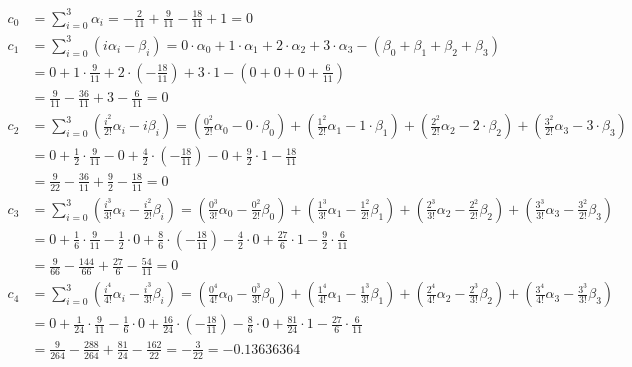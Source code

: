 \begin{align}
    c_0 &= \sum_{i=0}^{3} \alpha_i = -\frac{2}{11} + \frac{9}{11} - \frac{18}{11} + 1 = 0 \\
    c_1 &= \sum_{i=0}^{3} (i\alpha_i - \beta_i) = 0 \cdot \alpha_0 + 1 \cdot \alpha_1 + 2 \cdot \alpha_2 + 3 \cdot \alpha_3 - (\beta_0 + \beta_1 + \beta_2 + \beta_3) \nonumber \\
    &= 0 + 1 \cdot \frac{9}{11} + 2 \cdot \left(-\frac{18}{11}\right) + 3 \cdot 1 - \left(0 + 0 + 0 + \frac{6}{11}\right) \nonumber \\
    &= \frac{9}{11} - \frac{36}{11} + 3 - \frac{6}{11} = 0 \\
    c_2 &= \sum_{i=0}^{3} \left(\frac{i^2}{2!} \alpha_i - i \beta_i \right) = \left(\frac{0^2}{2!} \alpha_0 - 0 \cdot \beta_0\right) + \left(\frac{1^2}{2!} \alpha_1 - 1 \cdot \beta_1\right) + \left(\frac{2^2}{2!} \alpha_2 - 2 \cdot \beta_2\right) + \left(\frac{3^2}{2!} \alpha_3 - 3 \cdot \beta_3\right) \nonumber \\
    &= 0 + \frac{1}{2} \cdot \frac{9}{11} - 0 + \frac{4}{2} \cdot \left(-\frac{18}{11}\right) - 0 + \frac{9}{2} \cdot 1 - \frac{18}{11} \nonumber \\
    &= \frac{9}{22} - \frac{36}{11} + \frac{9}{2} - \frac{18}{11} = 0 \\
    c_3 &= \sum_{i=0}^{3} \left(\frac{i^3}{3!} \alpha_i - \frac{i^2}{2!} \beta_i \right) = \left(\frac{0^3}{3!} \alpha_0 - \frac{0^2}{2!} \beta_0\right) + \left(\frac{1^3}{3!} \alpha_1 - \frac{1^2}{2!} \beta_1\right) + \left(\frac{2^3}{3!} \alpha_2 - \frac{2^2}{2!} \beta_2\right) + \left(\frac{3^3}{3!} \alpha_3 - \frac{3^2}{2!} \beta_3\right) \nonumber \\
    &= 0 + \frac{1}{6} \cdot \frac{9}{11} - \frac{1}{2} \cdot 0 + \frac{8}{6} \cdot \left(-\frac{18}{11}\right) - \frac{4}{2} \cdot 0 + \frac{27}{6} \cdot 1 - \frac{9}{2} \cdot \frac{6}{11} \nonumber \\
    &= \frac{9}{66} - \frac{144}{66} + \frac{27}{6} - \frac{54}{11} = 0 \\
    c_4 &= \sum_{i=0}^{3} \left(\frac{i^4}{4!} \alpha_i - \frac{i^3}{3!} \beta_i \right) = \left(\frac{0^4}{4!} \alpha_0 - \frac{0^3}{3!} \beta_0 \right) + \left(\frac{1^4}{4!} \alpha_1 - \frac{1^3}{3!} \beta_1 \right) + \left(\frac{2^4}{4!} \alpha_2 - \frac{2^3}{3!} \beta_2 \right) + \left(\frac{3^4}{4!} \alpha_3 - \frac{3^3}{3!} \beta_3 \right) \nonumber \\
    &= 0 + \frac{1}{24} \cdot \frac{9}{11} - \frac{1}{6} \cdot 0 + \frac{16}{24} \cdot \left(-\frac{18}{11}\right) - \frac{8}{6} \cdot 0 + \frac{81}{24} \cdot 1 - \frac{27}{6} \cdot \frac{6}{11} \nonumber \\
    &= \frac{9}{264} - \frac{288}{264} + \frac{81}{24} - \frac{162}{22} = -\frac{3}{22} = - 0.13636364
\end{align}




